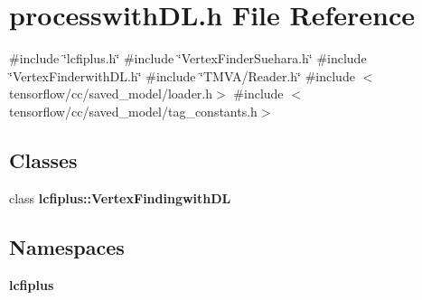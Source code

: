 \section{processwith\+D\+L.\+h File Reference}
\label{processwithDL_8h}
{\ttfamily \#include \char`\"{}lcfiplus.\+h\char`\"{}}\newline
{\ttfamily \#include \char`\"{}Vertex\+Finder\+Suehara.\+h\char`\"{}}\newline
{\ttfamily \#include \char`\"{}Vertex\+Finderwith\+D\+L.\+h\char`\"{}}\newline
{\ttfamily \#include \char`\"{}T\+M\+V\+A/\+Reader.\+h\char`\"{}}\newline
{\ttfamily \#include $<$tensorflow/cc/saved\+\_\+model/loader.\+h$>$}\newline
{\ttfamily \#include $<$tensorflow/cc/saved\+\_\+model/tag\+\_\+constants.\+h$>$}\newline
\subsection*{Classes}
\begin{DoxyCompactItemize}
\item 
class \textbf{ lcfiplus\+::\+Vertex\+Findingwith\+DL}
\end{DoxyCompactItemize}
\subsection*{Namespaces}
\begin{DoxyCompactItemize}
\item 
 \textbf{ lcfiplus}
\end{DoxyCompactItemize}
